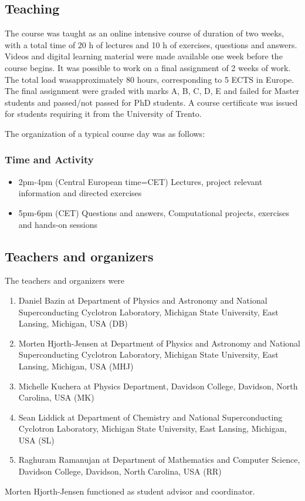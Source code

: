 \documentclass[prc,amsart,english]{revtex4}
\begin{document}
\subsection{Teaching}

The course was taught as an online intensive course of duration of two
weeks, with a total time of 20 h of lectures and 10 h of exercises,
questions and answers. Videos and digital learning material were made
available one week before the course begins. It was possible to work
on a final assignment of 2 weeks of work. The total load
wasapproximately 80 hours, corresponding to 5 ECTS in Europe. The
final assignment were graded with marks A, B, C, D, E and failed for
Master students and passed/not passed for PhD students. A course
certificate was issued for students requiring it from the University
of Trento.


The organization of a typical course day was as follows:

\subsubsection{Time and Activity}
\begin{itemize}
\item  2pm-4pm	(Central European time=CET) Lectures, project relevant information and directed exercises
\item 5pm-6pm	(CET) Questions and answers, Computational projects, exercises and hands-on sessions
\end{itemize}

\subsection{Teachers and organizers}
The teachers and organizers were
\begin{enumerate}
\item Daniel Bazin at Department of Physics and Astronomy and National Superconducting Cyclotron Laboratory, Michigan State University, East Lansing, Michigan, USA (DB)
\item Morten Hjorth-Jensen at Department of Physics and Astronomy and National Superconducting Cyclotron Laboratory, Michigan State University, East Lansing, Michigan, USA (MHJ)
\item Michelle Kuchera at Physics Department, Davidson College, Davidson, North Carolina, USA (MK)
\item Sean Liddick at Department of Chemistry and National Superconducting Cyclotron Laboratory, Michigan State University, East Lansing, Michigan, USA (SL)
\item Raghuram Ramanujan at Department of Mathematics and Computer Science, Davidson College, Davidson, North Carolina, USA (RR)
\end{enumerate}
Morten Hjorth-Jensen functioned as student advisor and coordinator.
\end{document}
